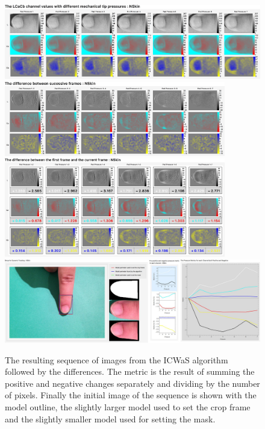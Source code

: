 \begin{figure}[h!]
  \centering
    \includegraphics[width=1.00\textwidth]{Chapter4/Figs/Final_Fig_Channels_NSkin.jpg}
    \includegraphics[width=0.86\textwidth]{Chapter4/Figs/Final_Fig_Difference_NSkin.jpg}
    \includegraphics[width=0.86\textwidth]{Chapter4/Figs/Final_Fig_Total_Difference_NSkin.jpg}
    \includegraphics[width=1.00\textwidth]{Chapter4/Figs/Final_Fig_Misc_NSkin.jpg}
        \caption{The resulting sequence of images from the ICWaS algorithm followed by the differences. The metric is the result of summing the positive and negative changes separately and dividing by the number of pixels. Finally the initial image of the sequence is shown with the model outline, the slightly larger model used to set the crop frame and the slightly smaller model used for setting the mask.}\label{fig:ICWaSResultNSkin}
\end{figure}


